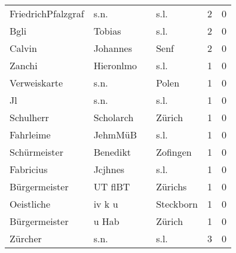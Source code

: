 \documentclass[10pt,a4paper,landscape]{article}
\begin{document}
\begin{longtable}{llllrr}
       FriedrichPfalzgraf &                               s.n. &             &                                        s.l. &          2 &         0 \\
                     Bgli &                             Tobias &             &                                        s.l. &          2 &         0 \\
                   Calvin &                           Johannes &             &                                        Senf &          2 &         0 \\
                   Zanchi &                          Hieronlmo &             &                                        s.l. &          1 &         0 \\
             Verweiskarte &                               s.n. &             &                                       Polen &          1 &         0 \\
                       Jl &                               s.n. &             &                                        s.l. &          1 &         0 \\
                Schulherr &                          Scholarch &             &                                      Zürich &          1 &         0 \\
                Fahrleime &                            JehmMüB &             &                                        s.l. &          1 &         0 \\
             Schürmeister &                           Benedikt &             &                                    Zofingen &          1 &         0 \\
                Fabricius &                            Jcjhnes &             &                                        s.l. &          1 &         0 \\
            Bürgermeister &                            UT flBT &             &                                     Zürichs &          1 &         0 \\
               Oeistliche &                             iv k u &             &                                   Steckborn &          1 &         0 \\
            Bürgermeister &                              u Hab &             &                                      Zürich &          1 &         0 \\
                  Zürcher &                               s.n. &             &                                        s.l. &          3 &         0 \\

\end{longtable}
\end{document}
